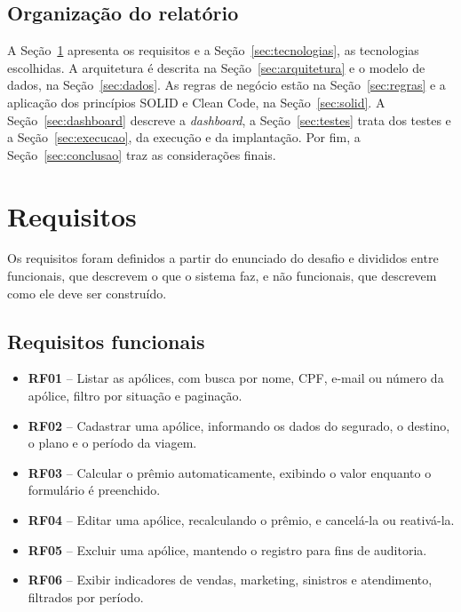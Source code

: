 \documentclass[12pt,a4paper]{article}
\begin{document}
\subsection{Organização do relatório}

A Seção~\ref{sec:requisitos} apresenta os requisitos e a Seção~\ref{sec:tecnologias}, as
tecnologias escolhidas. A arquitetura é descrita na Seção~\ref{sec:arquitetura} e o modelo de
dados, na Seção~\ref{sec:dados}. As regras de negócio estão na Seção~\ref{sec:regras} e a
aplicação dos princípios SOLID e Clean Code, na Seção~\ref{sec:solid}. A
Seção~\ref{sec:dashboard} descreve a \emph{dashboard}, a Seção~\ref{sec:testes} trata dos testes
e a Seção~\ref{sec:execucao}, da execução e da implantação. Por fim, a
Seção~\ref{sec:conclusao} traz as considerações finais.

\section{Requisitos}\label{sec:requisitos}

Os requisitos foram definidos a partir do enunciado do desafio e divididos entre funcionais,
que descrevem o que o sistema faz, e não funcionais, que descrevem como ele deve ser construído.

\subsection{Requisitos funcionais}

\begin{itemize}
  \item \textbf{RF01} -- Listar as apólices, com busca por nome, CPF, e-mail ou número da
        apólice, filtro por situação e paginação.
  \item \textbf{RF02} -- Cadastrar uma apólice, informando os dados do segurado, o destino, o
        plano e o período da viagem.
  \item \textbf{RF03} -- Calcular o prêmio automaticamente, exibindo o valor enquanto o
        formulário é preenchido.
  \item \textbf{RF04} -- Editar uma apólice, recalculando o prêmio, e cancelá-la ou reativá-la.
  \item \textbf{RF05} -- Excluir uma apólice, mantendo o registro para fins de auditoria.
  \item \textbf{RF06} -- Exibir indicadores de vendas, marketing, sinistros e atendimento,
        filtrados por período.
\end{itemize}
\end{document}
